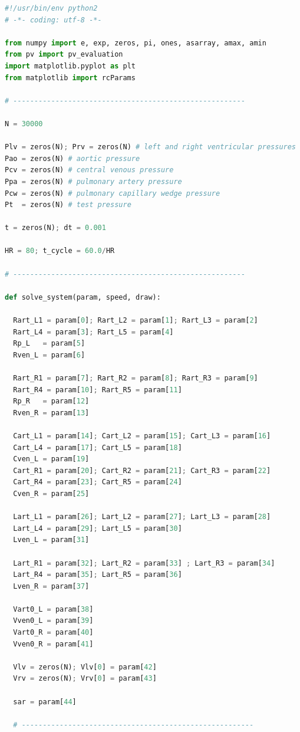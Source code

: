 \begin{lstlisting}[language=Python,caption={Математическая модель сердечно-сосудистой системы на языке программирования Python},label={list:cardiovascular_system_model}]
#!/usr/bin/env python2
# -*- coding: utf-8 -*-

from numpy import e, exp, zeros, pi, ones, asarray, amax, amin
from pv import pv_evaluation
import matplotlib.pyplot as plt
from matplotlib import rcParams

# -------------------------------------------------------

N = 30000

Plv = zeros(N); Prv = zeros(N) # left and right ventricular pressures
Pao = zeros(N) # aortic pressure
Pcv = zeros(N) # central venous pressure
Ppa = zeros(N) # pulmonary artery pressure
Pcw = zeros(N) # pulmonary capillary wedge pressure 
Pt  = zeros(N) # test pressure

t = zeros(N); dt = 0.001

HR = 80; t_cycle = 60.0/HR

# -------------------------------------------------------

def solve_system(param, speed, draw):

  Rart_L1 = param[0]; Rart_L2 = param[1]; Rart_L3 = param[2]
  Rart_L4 = param[3]; Rart_L5 = param[4]
  Rp_L   = param[5]
  Rven_L = param[6]   

  Rart_R1 = param[7]; Rart_R2 = param[8]; Rart_R3 = param[9]
  Rart_R4 = param[10]; Rart_R5 = param[11]
  Rp_R   = param[12]    
  Rven_R = param[13]  

  Cart_L1 = param[14]; Cart_L2 = param[15]; Cart_L3 = param[16]
  Cart_L4 = param[17]; Cart_L5 = param[18]
  Cven_L = param[19]
  Cart_R1 = param[20]; Cart_R2 = param[21]; Cart_R3 = param[22]
  Cart_R4 = param[23]; Cart_R5 = param[24]
  Cven_R = param[25]

  Lart_L1 = param[26]; Lart_L2 = param[27]; Lart_L3 = param[28]
  Lart_L4 = param[29]; Lart_L5 = param[30]
  Lven_L = param[31]

  Lart_R1 = param[32]; Lart_R2 = param[33] ; Lart_R3 = param[34]
  Lart_R4 = param[35]; Lart_R5 = param[36]
  Lven_R = param[37]

  Vart0_L = param[38] 
  Vven0_L = param[39]
  Vart0_R = param[40]
  Vven0_R = param[41]

  Vlv = zeros(N); Vlv[0] = param[42] 
  Vrv = zeros(N); Vrv[0] = param[43]

  sar = param[44]

  # -------------------------------------------------------


\end{lstlisting}

